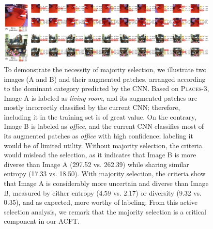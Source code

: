 
\begin{figure}
\begin{center}
\includegraphics[width=1.0\columnwidth]{Figures/CH3/fig_data_augumentation.pdf}
\end{center}
\caption[The Significance of Majority Selection]{
To demonstrate the necessity of majority selection, we illustrate two images (A and B) and their augmented patches, arranged according to the dominant category predicted by the CNN. 
Based on \textsc{Places-3}, Image A is labeled as {\em living room}, and its augmented patches are mostly incorrectly classified by the current CNN; therefore, including it in the training set is of great value. On the contrary, Image B is labeled as {\em office}, and the current CNN classifies most of its augmented patches as {\em office} with high confidence; labeling it would be of limited utility. 
Without majority selection, the criteria would mislead the selection, as it indicates that Image B is more diverse than Image A (297.52 vs. 262.39) while sharing similar entropy (17.33 vs. 18.50). With majority selection, the criteria show that Image A is considerably more uncertain and diverse than Image B, measured by either entropy (4.59 vs. 2.17) or diversity (9.32 vs. 0.35), and as expected, more worthy of labeling. From this active selection analysis, we remark that the majority selection is a critical component in our ACFT.
}
\label{ch3:fig:places_examples}
\end{figure}





